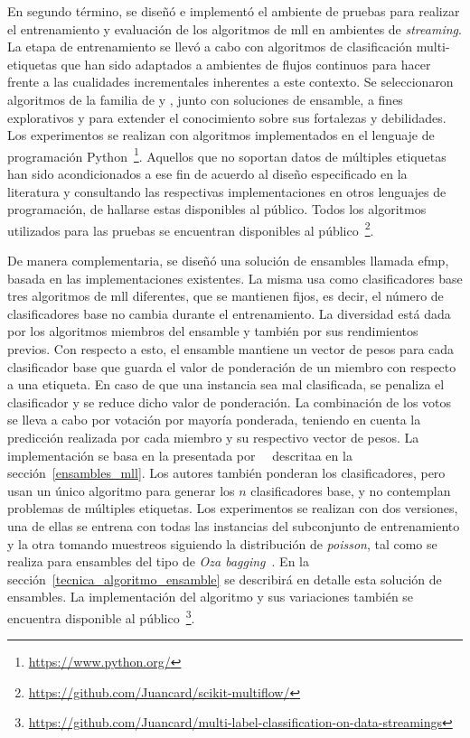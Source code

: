 En segundo término, se diseñó e implementó el ambiente de pruebas para realizar
el entrenamiento y evaluación de los algoritmos de \acrshort{mll} en ambientes
de \textit{streaming}. La etapa de entrenamiento se llevó a cabo con algoritmos
de clasificación multi-etiquetas que han sido adaptados a ambientes de flujos
continuos para hacer frente a las cualidades incrementales inherentes a este
contexto. Se seleccionaron algoritmos de la familia de  y , junto con soluciones de
ensamble, a fines explorativos y para extender el conocimiento sobre sus
fortalezas y debilidades.  Los experimentos se realizan con algoritmos
implementados en el lenguaje de programación
Python~\footnote{\url{https://www.python.org/}}.  Aquellos que no soportan datos
de múltiples etiquetas han sido acondicionados a ese fin de acuerdo al diseño
especificado en la literatura y consultando las respectivas implementaciones en
otros lenguajes de programación, de hallarse estas disponibles al público. Todos
los algoritmos utilizados para las pruebas se encuentran disponibles al
público~\footnote{\url{https://github.com/Juancard/scikit-multiflow/}}.

De manera complementaria, se diseñó una solución de ensambles llamada
\acrfull{efmp}, basada en las implementaciones existentes. La misma usa como
clasificadores base tres algoritmos de \acrshort{mll} diferentes, que se
mantienen fijos, es decir, el número de clasificadores base no cambia durante el
entrenamiento. La diversidad está dada por los algoritmos miembros del ensamble
y también por sus rendimientos previos. Con respecto a esto, el ensamble
mantiene un vector de pesos para cada clasificador base que guarda el valor de
ponderación de un miembro con respecto a una etiqueta. En caso de que una
instancia sea mal clasificada, se penaliza el clasificador y se reduce dicho
valor de ponderación. La combinación de los votos se lleva a cabo por votación
por mayoría ponderada, teniendo en cuenta la predicción realizada por cada
miembro y su respectivo vector de pesos. La implementación se basa en la
presentada por~\citeauthor{kolter_dynamic_2007}~\cite{kolter_dynamic_2007}
descritaa en la sección~\ref{ensambles_mll}. Los autores también ponderan los
clasificadores, pero usan un único algoritmo para generar los $n$ clasificadores
base, y no contemplan problemas de múltiples etiquetas. Los experimentos se
realizan con dos versiones, una de ellas se entrena con todas las instancias del
subconjunto de entrenamiento y la otra tomando muestreos siguiendo la
distribución de \textit{poisson}, tal como se realiza para ensambles del tipo de
\textit{Oza bagging}~\cite{oza_online_2005}. En la
sección~\ref{tecnica_algoritmo_ensamble} se describirá en detalle esta solución
de ensambles. La implementación del algoritmo y sus variaciones también se
encuentra disponible al
público~\footnote{\url{https://github.com/Juancard/multi-label-classification-on-data-streamings}}.

